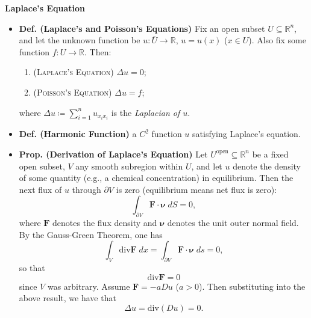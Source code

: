 \documentclass{article}
\renewcommand{\div}{\text{div}}
\begin{document}
	\textbf{Laplace's Equation}
	\begin{itemize}
		\item \textbf{Def. (Laplace's and Poisson's Equations)} Fix an open subset $U \subseteq \mathbb{R}^{n}$, and let the unknown function be $u: \overline{U} \to \mathbb{R}$, $u = u(x)$ ($x \in U$). Also fix some function $f: U \to \mathbb{R}$. Then: \vspace{-0.25cm}
		\begin{enumerate}[itemsep =-2pt,label = (\arabic{*})]
			\item (\textsc{Laplace's Equation}) $\Delta u = 0$; 
			\item (\textsc{Poisson's Equation}) $\Delta u = f$; 
		\end{enumerate}
		where $\Delta u \coloneqq \sum_{i = 1}^{n}u_{x_{i}x_{i}}$ is the \textit{Laplacian of $u$}. 
		
		\item \textbf{Def. (Harmonic Function)} a $C^{2}$ function $u$ satisfying Laplace's equation. 
		
		\item \textbf{Prop. (Derivation of Laplace's Equation)} Let $U^{\text{open}} \subseteq \mathbb{R}^{n}$ be a fixed open subset, $V$ any smooth subregion within $U$, and let $u$ denote the density of some quantity (e.g., a chemical concentration) in equilibrium. Then the next flux of $u$ through $\partial V$ is zero (equilibrium means net flux is zero): 
		\begin{equation*}
			\int_{\partial V}\mathbf{F} \cdot \boldsymbol{\nu}\;dS =0, 
		\end{equation*}
		where $\mathbf{F}$ denotes the flux density and $\boldsymbol{\nu}$ denotes the unit outer normal field. By the Gauss-Green Theorem, one has 
		\begin{equation*}
			\int_{V}\div\mathbf{F}\;dx = \int_{\partial V}\mathbf{F} \cdot \boldsymbol{\nu}\;ds = 0, 
		\end{equation*}
		so that 
		\begin{equation*}
			\div\mathbf{F} = 0
		\end{equation*}
		since $V$ was arbitrary. Assume $\mathbf{F} = -aDu$ ($a > 0$). Then substituting into the above result, we have that 
		\begin{equation*}
			\Delta u = \div(Du) =0. 
		\end{equation*}
		

\end{itemize}
\end{document}
